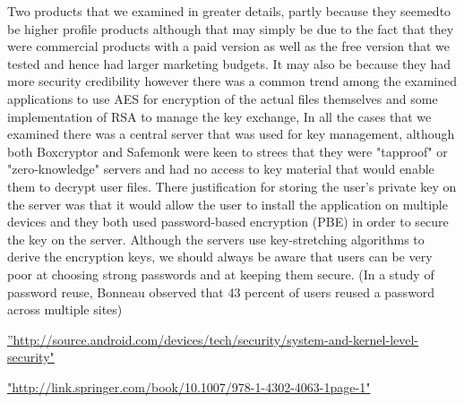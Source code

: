 Two products that we examined in greater details, partly because they seemedto be higher profile products although that may simply be due to the fact that they were commercial products with a paid version as well as the free version that we tested and hence had larger marketing budgets.  It may also be because they had more security credibility however there was a common trend among the examined applications to use AES for encryption of the actual files themselves and some implementation of RSA to manage the key exchange,  In all the cases that we examined there was a central server that was used for key management, although both Boxcryptor and Safemonk were keen to strees that they were "tapproof" or "zero-knowledge" servers and had no access to key material that would enable them to decrypt user files.  There justification for storing the user's private key on the server was that it would allow the user to install the application on multiple devices and they both used password-based encryption (PBE) in order to secure the key on the server.  Although the servers use key-stretching algorithms to derive the encryption keys, we should always be aware that users can be very poor at choosing strong passwords and at keeping them secure. (In a study of password reuse, Bonneau \cite{das2014tangled} observed that 43 percent of  users reused a password across multiple sites)





























\hyperref[label_name]{''http://source.android.com/devices/tech/security/system-and-kernel-level-security"}



\hyperref[label_name2]{"http://link.springer.com/book/10.1007/978-1-4302-4063-1page-1"}

